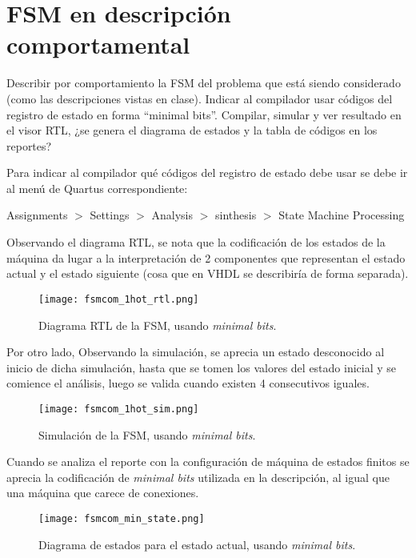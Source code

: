 \section{FSM en descripción comportamental \label{sec:s2}}



\begin{center}
	\begin{minipage}{10cm}
		Describir por comportamiento la FSM del problema que está siendo considerado (como las
		descripciones vistas en clase). Indicar al compilador usar códigos del registro de estado en forma
		``minimal bits''. Compilar, simular y ver resultado en el visor RTL, ¿se genera el diagrama de
		estados y la tabla de códigos en los reportes?
		
		\enter
		
		Para indicar al compilador qué códigos del registro de estado debe usar se debe ir al menú de
		Quartus correspondiente: 
		
		\enter
		
		Assignments $>$ Settings $>$ Analysis $>$ sinthesis $>$ State Machine Processing
	\end{minipage}
\end{center}

\enter


Observando el diagrama RTL, se nota que la codificación de los estados de la
máquina da lugar a la interpretación de 2 componentes que representan el estado
actual y el estado siguiente (cosa que en VHDL se describiría de forma separada).
\begin{figure}[ht]
	\centering
	\texttt{[image: fsmcom\_1hot\_rtl.png]}
	\caption{
		Diagrama RTL de la FSM, usando \textit{minimal bits}.
		\label{fig:fsmcom_1hot_rtl}
	}
\end{figure}


Por otro lado, Observando la simulación, se aprecia un estado desconocido al inicio de dicha simulación, hasta 
que se tomen los valores del estado inicial y se comience el análisis, luego se valida cuando existen 4 consecutivos iguales.
\begin{figure}[ht]
	\centering
	\texttt{[image: fsmcom\_1hot\_sim.png]}
	\caption{
		Simulación de la FSM, usando \textit{minimal bits}.
		\label{fig:fsmcom_1hot_sim}
	}
\end{figure}

\newpage

Cuando se analiza el reporte con la configuración de máquina de estados finitos
se aprecia la codificación de \textit{minimal bits} utilizada en la descripción,
al igual que una máquina que carece de conexiones.
\begin{figure}[ht]
	\centering
	\texttt{[image: fsmcom\_min\_state.png]}
	\caption{
		Diagrama de estados para el estado actual, usando \textit{minimal bits}.
		\label{fig:fsmcom_min_state}
	}
\end{figure}

